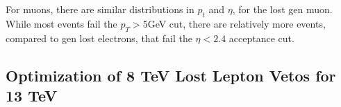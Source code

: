 For muons, there are similar distributions in $p_{t}$ and $\eta$, for the lost gen muon.  While most events fail the $p_{T}>5$GeV cut, there are relatively more events, compared to gen lost electrons, that fail the $\eta<2.4$ acceptance cut.  


\subsection{Optimization of 8 TeV Lost Lepton Vetos for 13 TeV}
\label{sec:lost_lepton_studies:optimization}

